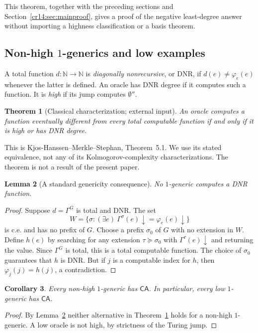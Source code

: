 \documentclass[11pt,a4paper]{article}
\newcommand{\N}{\mathbb N}
\newcommand{\extends}{\succeq}
\newcommand{\doublezero}{\emptyset''}
\newcommand{\CA}{\mathsf{CA}}
\newtheorem{theorem}{Theorem}[section]
\newtheorem{lemma}[theorem]{Lemma}
\newtheorem{corollary}[theorem]{Corollary}
\theoremstyle{definition}
\theoremstyle{remark}
\begin{document}
This theorem, together with the preceding sections and
Section~\ref{cr14:sec:mainproof}, gives a proof of the negative least-degree
answer without importing a highness classification or a basis theorem.

\subsection{Non-high \texorpdfstring{$1$}{1}-generics and low examples}
A total function $d:\N\to\N$ is \emph{diagonally nonrecursive}, or DNR,
if $d(e)\ne\varphi_e(e)$ whenever the latter is defined. An oracle has
DNR degree if it computes such a function. It is \emph{high} if its jump
computes $\doublezero$.

\begin{theorem}[Classical characterization; external input]
\label{cr14:thm:KMS}
An oracle computes a function eventually different from every total
computable function if and only if it is high or has DNR degree.
\end{theorem}

This is Kjos-Hanssen--Merkle--Stephan, Theorem~5.1.\cite[Theorem~5.1]{KMS}
We use its stated equivalence, not any of its Kolmogorov-complexity
characterizations. The theorem is not a result of the present paper.

\begin{lemma}[A standard genericity consequence]\label{cr14:lem:nodnr}
No $1$-generic computes a DNR function.
\end{lemma}
\begin{proof}
Suppose $d=\Gamma^G$ is total and DNR. The set
\[
 W=\{\sigma:(\exists e)\ \Gamma^\sigma(e)\downarrow
                                  =\varphi_e(e)\downarrow\}
\]
is c.e. and has no prefix of $G$. Choose a prefix $\sigma_0$ of $G$ with
no extension in $W$. Define $h(e)$ by searching for any extension
$\tau\extends\sigma_0$ with $\Gamma^\tau(e)\downarrow$ and returning
the value. Since $\Gamma^G$ is total, this is a total computable function.
The choice of $\sigma_0$ guarantees that $h$ is DNR. But if $j$ is a
computable index for $h$, then $\varphi_j(j)=h(j)$, a contradiction.
\end{proof}

\begin{corollary}\label{cr14:cor:nonhigh}
Every non-high $1$-generic has $\CA$. In particular, every low $1$-generic
has $\CA$.
\end{corollary}
\begin{proof}
By Lemma~\ref{cr14:lem:nodnr} neither alternative in
Theorem~\ref{cr14:thm:KMS} holds for a non-high $1$-generic.
A low oracle is not high, by strictness of the Turing jump.
\end{proof}
\end{document}
